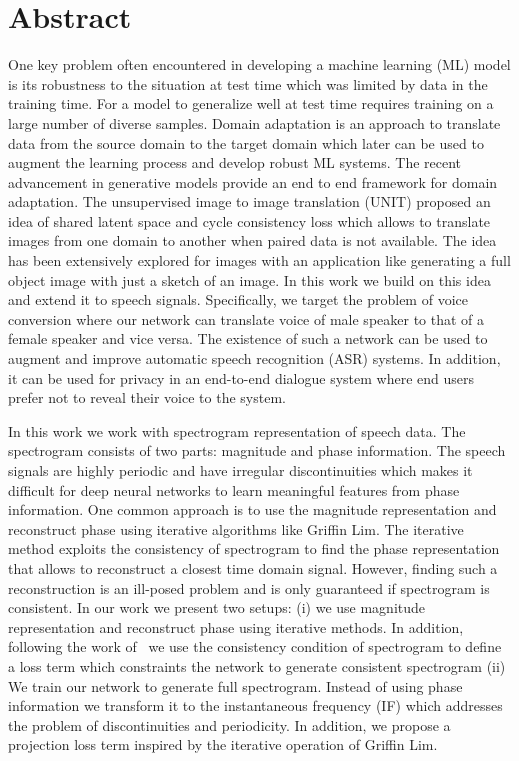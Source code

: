 \chapter*{\centering \Large Abstract}
\label{abstract}
One key problem often encountered in developing a machine learning (ML) model is its robustness to the situation at test time which was limited by data in the training time. For a model to generalize well at test time requires training on a large number of diverse samples. Domain adaptation is an approach to translate data from the source domain to the target domain which later can be used to augment the learning process and develop robust ML systems. The recent advancement in generative models provide an end to end framework for domain adaptation. The unsupervised image to image translation (UNIT) proposed an idea of shared latent space and cycle consistency loss which allows to translate images from one domain to another when paired data is not available. The idea has been extensively explored for images with an application like generating a full object image with just a sketch of an image. In this work we build on this idea and extend it to speech signals. Specifically, we target the problem of voice conversion where our network can translate voice of male speaker to that of a female speaker and vice versa. The existence of such a network can be used to augment and improve automatic speech recognition (ASR) systems. In addition, it can be used for privacy in an end-to-end dialogue system where end users prefer not to reveal their voice to the system.  

In this work we work with spectrogram representation of speech data. The spectrogram consists of two parts: magnitude and phase information. The speech signals are highly periodic and have irregular discontinuities which makes it difficult for deep neural networks to learn meaningful features from phase information. One common approach is to use the magnitude representation and reconstruct phase  using iterative algorithms like Griffin Lim. The iterative method exploits the consistency of spectrogram to find the phase representation that allows to reconstruct a closest time domain signal. However, finding such a reconstruction is an ill-posed problem and is only guaranteed if spectrogram is consistent. In our work we present two setups: (i) we use magnitude representation and reconstruct phase using iterative methods. In addition, following the work of~\cite{??} we use the consistency condition of spectrogram to define a loss term which constraints the network to generate consistent spectrogram (ii) We train our network to generate full spectrogram. Instead of using phase information we transform it to the instantaneous frequency (IF) which addresses the problem of discontinuities and periodicity. In addition, we propose a projection loss term inspired by the iterative operation of Griffin Lim.


  